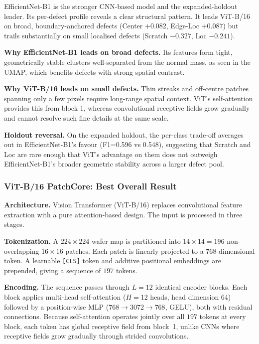 \documentclass[11pt]{article}
\begin{document}
EfficientNet-B1 is the stronger CNN-based model and the expanded-holdout leader. Its per-defect profile reveals a clear structural pattern. It leads ViT-B/16 on broad, boundary-anchored defects (Center $+0.082$, Edge-Loc $+0.087$) but trails substantially on small localised defects (Scratch $-0.327$, Loc $-0.241$).

\textbf{Why EfficientNet-B1 leads on broad defects.} Its features form tight, geometrically stable clusters well-separated from the normal mass, as seen in the UMAP, which benefits defects with strong spatial contrast.

\textbf{Why ViT-B/16 leads on small defects.} Thin streaks and off-centre patches spanning only a few pixels require long-range spatial context. ViT's self-attention provides this from block 1, whereas convolutional receptive fields grow gradually and cannot resolve such fine details at the same scale.

\textbf{Holdout reversal.} On the expanded holdout, the per-class trade-off averages out in EfficientNet-B1's favour (F1=0.596 vs 0.548), suggesting that Scratch and Loc are rare enough that ViT's advantage on them does not outweigh EfficientNet-B1's broader geometric stability across a larger defect pool.

\subsubsection{ViT-B/16 PatchCore: Best Overall Result}

\textbf{Architecture.}
Vision Transformer (ViT-B/16) replaces convolutional feature extraction with a pure attention-based design.
The input is processed in three stages.

\textbf{Tokenization.}
A $224\!\times\!224$ wafer map is partitioned into $14\!\times\!14 = 196$ non-overlapping $16\!\times\!16$ patches.
Each patch is linearly projected to a $768$-dimensional token.
A learnable \texttt{[CLS]} token and additive positional embeddings are prepended, giving a sequence of $197$ tokens.

\textbf{Encoding.}
The sequence passes through $L=12$ identical encoder blocks.
Each block applies multi-head self-attention ($H=12$ heads, head dimension $64$) followed by a position-wise MLP ($768\!\to\!3072\!\to\!768$, GELU), both with residual connections.
Because self-attention operates jointly over all $197$ tokens at every block, each token has global receptive field from block~1, unlike CNNs where receptive fields grow gradually through strided convolutions.
\end{document}
